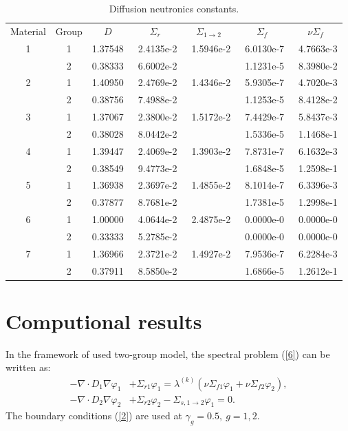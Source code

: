 \documentclass[runningheads,a4paper]{llncs}
\begin{document}
\begin{table}[htp]
\caption{Diffusion neutronics constants.}
\label{t-1}
\begin{center}
\begin{tabular}{ccrrrrr}
\rowcolor{col1}
Material & Group & \multicolumn{1}{c}{$D$} & \multicolumn{1}{c}{$\Sigma_r$} & \multicolumn{1}{c}{$\Sigma_{1\to 2}$} & \multicolumn{1}{c}{$\Sigma_f$}& \multicolumn{1}{c}{$\nu\Sigma_f$}\\
\rowcolor{col3}
1 & 1 & 1.37548 & ~2.4135e-2 & ~1.5946e-2 & ~6.0130e-7 & ~4.7663e-3 \\
\rowcolor{col2}
  & 2 & 0.38333 & 6.6002e-2 &           & 1.1231e-5 & 8.3980e-2 \\
\rowcolor{col3}
2 & 1 & 1.40950 & 2.4769e-2 & 1.4346e-2 & 5.9305e-7 & 4.7020e-3 \\
\rowcolor{col2}
  & 2 & 0.38756 & 7.4988e-2 &           & 1.1253e-5 & 8.4128e-2 \\
\rowcolor{col3}
3 & 1 & 1.37067 & 2.3800e-2 & 1.5172e-2 & 7.4429e-7 & 5.8437e-3 \\
\rowcolor{col2}
  & 2 & 0.38028 & 8.0442e-2 &           & 1.5336e-5 & 1.1468e-1 \\
\rowcolor{col3}
4 & 1 & 1.39447 & 2.4069e-2 & 1.3903e-2 & 7.8731e-7 & 6.1632e-3 \\
\rowcolor{col2}
  & 2 & 0.38549 & 9.4773e-2 &           & 1.6848e-5 & 1.2598e-1 \\
\rowcolor{col3}
5 & 1 & 1.36938 & 2.3697e-2 & 1.4855e-2 & 8.1014e-7 & 6.3396e-3 \\
\rowcolor{col2}
  & 2 & 0.37877 & 8.7681e-2 &           & 1.7381e-5 & 1.2998e-1 \\
\rowcolor{col3}
6 & 1 & 1.00000 & 4.0644e-2 & 2.4875e-2 & 0.0000e-0 & 0.0000e-0 \\
\rowcolor{col2}
  & 2 & 0.33333 & 5.2785e-2 &           & 0.0000e-0 & 0.0000e-0 \\
\rowcolor{col3}
7 & 1 & 1.36966 & 2.3721e-2 & 1.4927e-2 & 7.9536e-7 & 6.2284e-3 \\
\rowcolor{col2}
  & 2 & 0.37911 & 8.5850e-2 &           & 1.6866e-5 & 1.2612e-1 \\

\end{tabular}
\end{center}
\end{table}

\section{Computional results}
In the framework of used two-group model, the spectral problem (\ref{6}) can be written as:
\begin{equation}\label{7}
\begin{split}
 - \nabla \cdot D_1 \nabla \varphi_1 & + \Sigma_{r1} \varphi_1  
 = \lambda^{(k)} (\nu \Sigma_{f1} \varphi_1 + \nu \Sigma_{f2} \varphi_2), \\
 - \nabla \cdot D_2 \nabla \varphi_2 & + \Sigma_{r2} \varphi_2 - \Sigma_{s,1\rightarrow 2} \varphi_1  
 = 0.
\end{split}
\end{equation}
The boundary conditions (\ref{2}) are used at $\gamma_g = 0.5, \ g = 1,2$.
\end{document}

